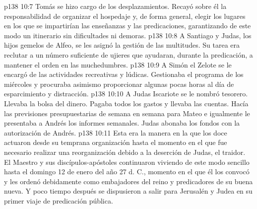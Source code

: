 \vs p138 10:7 Tomás se hizo cargo de los desplazamientos. Recayó sobre él la responsabilidad de organizar el hospedaje y, de forma general, elegir los lugares en los que se impartirían las enseñanzas y las predicaciones, garantizando de este modo un itinerario sin dificultades ni demoras.
\vs p138 10:8 A Santiago y Judas, los hijos gemelos de Alfeo, se les asignó la gestión de las multitudes. Su tarea era reclutar a un número suficiente de ujieres que ayudaran, durante la predicación, a mantener el orden en las muchedumbres.
\vs p138 10:9 A Simón el Zelote se le encargó de las actividades recreativas y lúdicas. Gestionaba el programa de los miércoles y procuraba asimismo proporcionar algunas pocas horas al día de esparcimiento y distracción.
\vs p138 10:10 A Judas Iscariote se le nombró tesorero. Llevaba la bolsa del dinero. Pagaba todos los gastos y llevaba las cuentas. Hacía las previsiones presupuestarias de semana en semana para Mateo e igualmente le presentaba a Andrés los informes semanales. Judas abonaba los fondos con la autorización de Andrés.
\vs p138 10:11 \pc Esta era la manera en la que los doce actuaron desde su temprana organización hasta el momento en el que fue necesario realizar una reorganización debido a la deserción de Judas, el traidor. El Maestro y sus discípulos\hyp{}apóstoles continuaron viviendo de este modo sencillo hasta el domingo 12 de enero del año 27 d. C., momento en el que él los convocó y les ordenó debidamente como embajadores del reino y predicadores de su buena nueva. Y poco tiempo después se dispusieron a salir para Jerusalén y Judea en su primer viaje de predicación pública.
